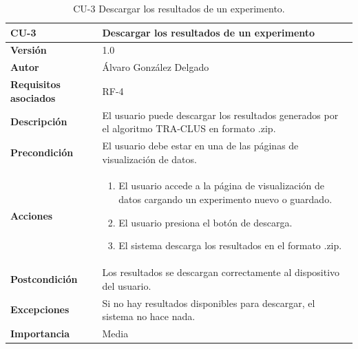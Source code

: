 \begin{table}[p]
	\centering
	\begin{tabularx}{\linewidth}{ p{} p{} }
		\toprule
		\textbf{CU-3}    & \textbf{Descargar los resultados de un experimento} \\
		\toprule
		\textbf{Versión}              & 1.0    \\
		\textbf{Autor}                & Álvaro González Delgado \\
		\textbf{Requisitos asociados} & RF-4 \\
		\textbf{Descripción}          & El usuario puede descargar los resultados generados por el algoritmo TRA-CLUS en formato .zip. \\
		\textbf{Precondición}         & El usuario debe estar en una de las páginas de visualización de datos. \\
		\textbf{Acciones}             &
		\begin{enumerate}
			\item El usuario accede a la página de visualización de datos cargando un experimento nuevo o guardado.
			\item El usuario presiona el botón de descarga.
			\item El sistema descarga los resultados en el formato .zip.
		\end{enumerate} \\
		\textbf{Postcondición}        & Los resultados se descargan correctamente al dispositivo del usuario. \\
		\textbf{Excepciones}          & Si no hay resultados disponibles para descargar, el sistema no hace nada. \\
		\textbf{Importancia}          & Media \\
		\bottomrule
	\end{tabularx}
	\caption{CU-3 Descargar los resultados de un experimento.}
\end{table}

\FloatBarrier

